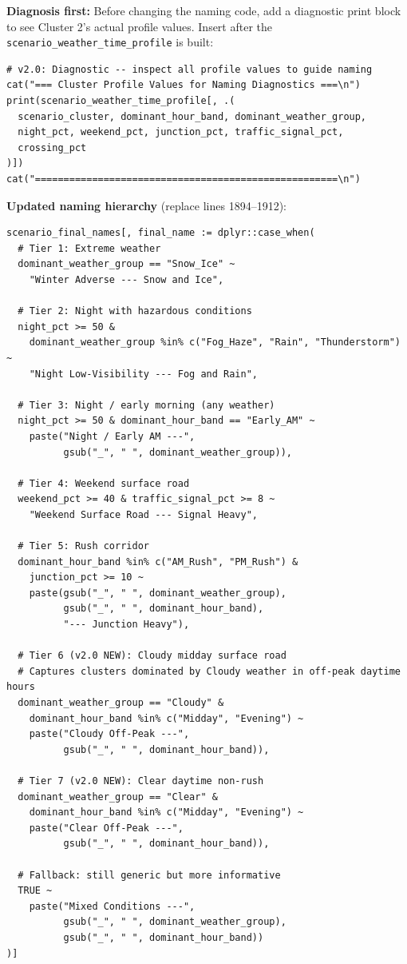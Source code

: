 \documentclass[11pt]{article}
\newcommand{\rcode}[1]{\texttt{#1}}
\begin{document}
\textbf{Diagnosis first:} Before changing the naming code, add a diagnostic
print block to see Cluster 2's actual profile values. Insert after the
\rcode{scenario\_weather\_time\_profile} is built:

\begin{lstlisting}
# v2.0: Diagnostic -- inspect all profile values to guide naming
cat("=== Cluster Profile Values for Naming Diagnostics ===\n")
print(scenario_weather_time_profile[, .(
  scenario_cluster, dominant_hour_band, dominant_weather_group,
  night_pct, weekend_pct, junction_pct, traffic_signal_pct,
  crossing_pct
)])
cat("=====================================================\n")
\end{lstlisting}

\textbf{Updated naming hierarchy} (replace lines 1894--1912):
\begin{lstlisting}
scenario_final_names[, final_name := dplyr::case_when(
  # Tier 1: Extreme weather
  dominant_weather_group == "Snow_Ice" ~
    "Winter Adverse --- Snow and Ice",

  # Tier 2: Night with hazardous conditions
  night_pct >= 50 &
    dominant_weather_group %in% c("Fog_Haze", "Rain", "Thunderstorm") ~
    "Night Low-Visibility --- Fog and Rain",

  # Tier 3: Night / early morning (any weather)
  night_pct >= 50 & dominant_hour_band == "Early_AM" ~
    paste("Night / Early AM ---",
          gsub("_", " ", dominant_weather_group)),

  # Tier 4: Weekend surface road
  weekend_pct >= 40 & traffic_signal_pct >= 8 ~
    "Weekend Surface Road --- Signal Heavy",

  # Tier 5: Rush corridor
  dominant_hour_band %in% c("AM_Rush", "PM_Rush") &
    junction_pct >= 10 ~
    paste(gsub("_", " ", dominant_weather_group),
          gsub("_", " ", dominant_hour_band),
          "--- Junction Heavy"),

  # Tier 6 (v2.0 NEW): Cloudy midday surface road
  # Captures clusters dominated by Cloudy weather in off-peak daytime hours
  dominant_weather_group == "Cloudy" &
    dominant_hour_band %in% c("Midday", "Evening") ~
    paste("Cloudy Off-Peak ---",
          gsub("_", " ", dominant_hour_band)),

  # Tier 7 (v2.0 NEW): Clear daytime non-rush
  dominant_weather_group == "Clear" &
    dominant_hour_band %in% c("Midday", "Evening") ~
    paste("Clear Off-Peak ---",
          gsub("_", " ", dominant_hour_band)),

  # Fallback: still generic but more informative
  TRUE ~
    paste("Mixed Conditions ---",
          gsub("_", " ", dominant_weather_group),
          gsub("_", " ", dominant_hour_band))
)]
\end{lstlisting}
\end{document}
